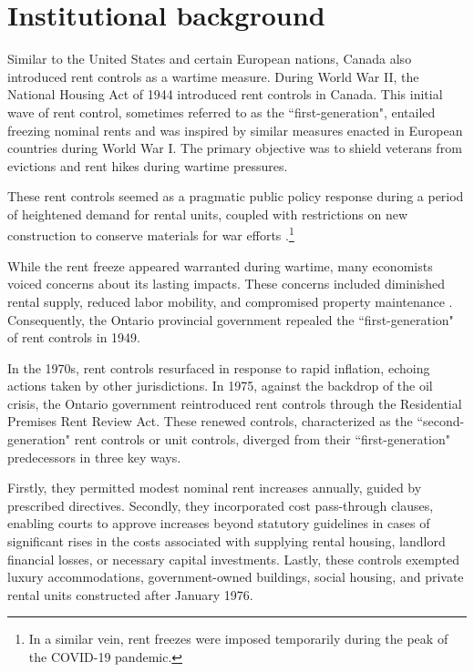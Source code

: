 \documentclass[parskip=full]{article}
\begin{document}
\section{Institutional background}\label{sec:insitutional_background}

Similar to the United States and certain European nations, Canada also introduced rent controls as a wartime measure. During World War II, the National Housing Act of 1944 introduced rent controls in Canada. This initial wave of rent control, sometimes referred to as the ``first-generation", entailed freezing nominal rents and was inspired by similar measures enacted in European countries during World War I. The primary objective was to shield veterans from evictions and rent hikes during wartime pressures.

These rent controls seemed as a pragmatic public policy response during a period of heightened demand for rental units, coupled with restrictions on new construction to conserve materials for war efforts \citep{downs-1988}.\footnote{In a similar vein, rent freezes were imposed temporarily during the peak of the COVID-19 pandemic.}

While the rent freeze appeared warranted during wartime, many economists voiced concerns about its lasting impacts. These concerns included diminished rental supply, reduced labor mobility, and compromised property maintenance \citep{arnott-1995}. Consequently, the Ontario provincial government repealed the ``first-generation" of rent controls in 1949.

In the 1970s, rent controls resurfaced in response to rapid inflation, echoing actions taken by other jurisdictions. In 1975, against the backdrop of the oil crisis, the Ontario government reintroduced rent controls through the Residential Premises Rent Review Act. These renewed controls, characterized as the ``second-generation" rent controls or unit controls, diverged from their ``first-generation" predecessors in three key ways.

Firstly, they permitted modest nominal rent increases annually, guided by prescribed directives. Secondly, they incorporated cost pass-through clauses, enabling courts to approve increases beyond statutory guidelines in cases of significant rises in the costs associated with supplying rental housing, landlord financial losses, or necessary capital investments. Lastly, these controls exempted luxury accommodations, government-owned buildings, social housing, and private rental units constructed after January 1976.
\end{document}
